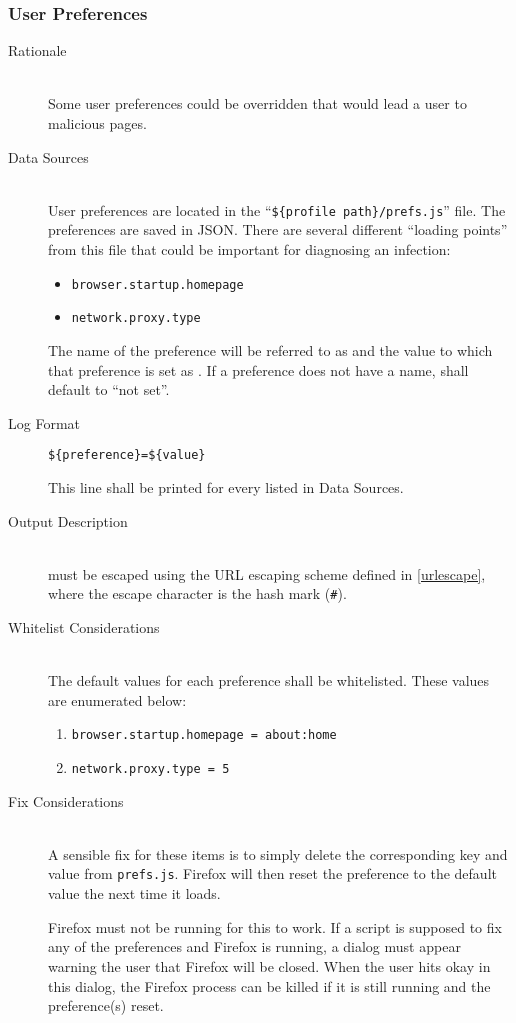 \subsubsection{User Preferences}
\begin{description}
\item[Rationale] \hfill \\
Some user preferences could be overridden that would lead a user to malicious
pages.  
\item[Data Sources] \hfill \\
User preferences are located in the ``\verb|${profile path}/prefs.js|'' file. 
The preferences are saved in JSON. There are several different
``loading points'' from this file that could be important for diagnosing an
infection:
\begin{itemize}
  \item \verb|browser.startup.homepage|
  \item \verb|network.proxy.type|
\end{itemize}
The name of the preference will be referred to as  and the
value to which that preference is set as .  If a preference does not
have a name,  shall default to ``not set''.
\item[Log Format] \hfill 
\vspace{-\baselineskip}
\begin{verbatim}
${preference}=${value}
\end{verbatim}
This line shall be printed for every  listed in Data Sources.
\item[Output Description] \hfill \\
 must be escaped using the URL escaping scheme defined in
\ref{urlescape}, where the escape character is the hash mark (\verb|#|).
\item[Whitelist Considerations] \hfill \\
The default values for each preference shall be whitelisted.  These values are
enumerated below:
\begin{enumerate}
  \item \verb|browser.startup.homepage = about:home|
  \item \verb|network.proxy.type = 5|
\end{enumerate}

\item[Fix Considerations] \hfill \\
A sensible fix for these items is to simply delete the corresponding key and
value from \verb|prefs.js|.  Firefox will then reset the preference to the
default value the next time it loads.

Firefox must not be running for this to work.  If a script is supposed to fix
any of the preferences and Firefox is running, a dialog must appear warning the
user that Firefox will be closed.  When the user hits okay in this dialog, the
Firefox process can be killed if it is still running and the preference(s)
reset.
\end{description}

